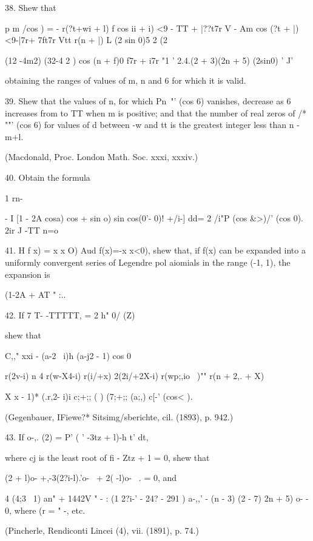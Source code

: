 {{{{38. Shew that

p m /cos ) = - r(?t+wi + l) f cos ii + i) <9 - TT + |??t7r V - Am cos
(?t + |)<9-|7r+ 7ft7r Vtt r(n + |) L (2 sin 0)5 2 (2%

(12 -4m2) (32-4 2 ) cos (n + f)0 f7r + i7r "1 ' 2.4.(2 + 3)(2n + 5)
(2sin0) ' J'

obtaining the ranges of values of m, n and 6 for which it is valid.


39. Shew that the values of n, for which Pn~"' (cos 6) vanishes,
decrease as 6 increases from to TT when m is positive; and that the
number of real zeros of /* ""' (cos 6) for values of d between -w and
tt is the greatest integer less than n - m+l.

(Macdonald, Proc. London Math. Soc. xxxi, xxxiv.)

40. Obtain the formula

1 rn- \,

- I [1 - 2A cosa) cos + sin o) sin cos(0'- 0)! +/i-] dd= 2 /i"P (cos
\&>)/' (cos 0). 2ir J -TT n=o


41. H f x) = x x O) Aud f(x)=-x x<0), shew that, if f(x) can be
expanded into a uniformly convergent series of Legendre pol aiomials
in the range (-1, 1), the expansion is

 (1-2A + AT " :..

42. If 7 T- -TTTTT, = 2 h" 0/ (Z)

shew that

C,," xxi - (a-2 \ i)h (a-j2 - 1) cos 0

  r(2v-i) n 4 r(w-X4-i) r(i/+x) 2(2i/+2X-i) r(wp;,io ~)"" r(n + 2,. +
X)

X x - 1)* (.r,2- i)i c;+;; ( ) (7;+;; (a;,) c[-' (cos< ).

(Gegenbauer, IFiewe?* Sitsimg/sberichte, cil. (1893), p. 942.)

43. If o-,. (2) = P' (  ' -3tz + l)-h t' dt,

where cj is the least root of fi - Ztz + 1 = 0, shew that

(2 + l)o- +,-3(2?i-l).'o- \, + 2( -l)o- \ . = 0, and

4 (4;3 \ 1) an" + 1442V " - : (1 2?i-' - 24? - 291 ) a-,,' - (n - 3)
(2 - 7) 2n + 5) o- - 0, where (r = " -, etc.

(Pincherle, Rendiconti Lincei (4), vii. (1891), p. 74.)

}}}}
